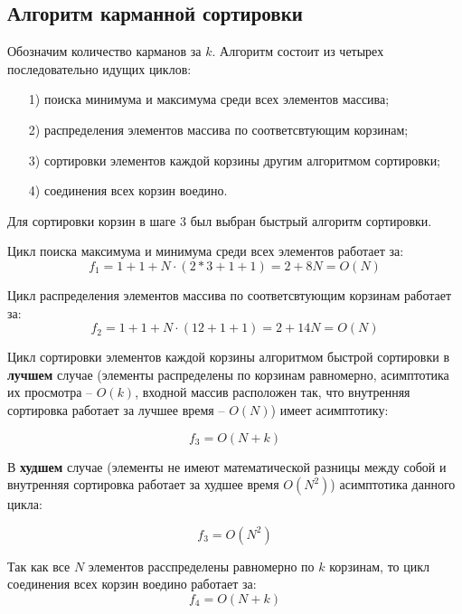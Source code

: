 \documentclass[12pt]{report}
\begin{document}
	\subsection{Алгоритм карманной сортировки}
	
	Обозначим количество карманов за $k$. Алгоритм состоит из четырех последовательно идущих циклов: 
	\begin{enumerate}
		\item[1)] поиска минимума и максимума среди всех элементов массива;
		\item[2)] распределения элементов массива по соответсвтующим корзинам;
		\item[3)] сортировки элементов каждой корзины другим алгоритмом сортировки;
		\item[4)] соединения всех корзин воедино.
	\end{enumerate}
	
	Для сортировки корзин в шаге 3 был выбран быстрый алгоритм сортировки.
	\newline
	
	Цикл поиска максимума и минимума среди всех элементов работает за:
	\begin{equation}
		f_{1} = 1 + 1 + N\cdot(2 * 3 + 1 + 1) = 2 + 8N = O(N)
	\end{equation}
	
	Цикл распределения элементов массива по соответсвтующим корзинам работает за:
	\begin{equation}
		f_{2} = 1 + 1 + N\cdot(12 + 1 + 1) = 2 + 14N = O(N)
	\end{equation}
	
	Цикл сортировки элементов каждой корзины алгоритмом быстрой сортировки в \textbf{лучшем} случае (элементы распределены по корзинам равномерно, асимптотика их просмотра -- $O(k)$, входной массив расположен так, что внутренняя сортировка работает за лучшее время -- $O(N)$) имеет асимптотику:
	
	\begin{equation}
	f_{3} = O(N + k)
	\end{equation}
	
	В \textbf{худшем} случае (элементы не имеют математической разницы между собой и внутренняя сортировка работает за худшее время $O(N^2)$) асимптотика данного цикла: 
	
	\begin{equation}
	f_{3} = O(N^2)
	\end{equation}
	
	Так как все $N$ элементов расспределены равномерно по $k$ корзинам, то цикл соединения всех корзин воедино работает за:
	\begin{equation}
		f_{4} = O(N + k)
	\end{equation}
	
\end{document}
